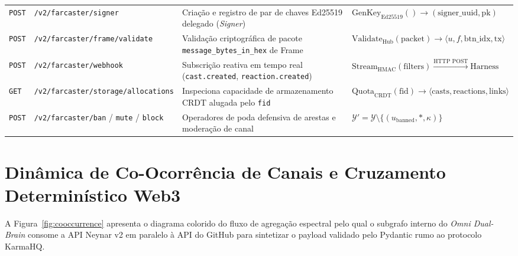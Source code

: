 \documentclass[11pt,a4paper]{article}
\begin{document}
\begin{longtable}{@{}p{1.15cm}>{\raggedright\arraybackslash}p{5.65cm}>{\raggedright\arraybackslash}p{4.15cm}>{\raggedright\arraybackslash}p{4.85cm}@{}}
\texttt{POST} & \texttt{/v2/farcaster/signer} & Criação e registro de par de chaves Ed25519 delegado (\emph{Signer}) & $\text{GenKey}_{\text{Ed25519}}() \to (\text{signer\_uuid}, \text{pk})$ \\
\rowcolor{slateBg}
\texttt{POST} & \texttt{/v2/farcaster/frame/validate} & Validação criptográfica de pacote \texttt{message\_bytes\_in\_hex} de Frame & $\text{Validate}_{\text{Hub}}(\text{packet}) \to \langle u, f, \text{btn\_idx}, \text{tx} \rangle$ \\
\texttt{POST} & \texttt{/v2/farcaster/webhook} & Subscrição reativa em tempo real (\texttt{cast.created}, \texttt{reaction.created}) & $\text{Stream}_{\text{HMAC}}(\text{filters}) \xrightarrow{\text{HTTP POST}} \text{Harness}$ \\
\rowcolor{slateBg}
\texttt{GET} & \texttt{/v2/farcaster/storage/allocations} & Inspeciona capacidade de armazenamento CRDT alugada pelo \texttt{fid} & $\text{Quota}_{\text{CRDT}}(\text{fid}) \to \langle \text{casts}, \text{reactions}, \text{links} \rangle$ \\
\texttt{POST} & \texttt{/v2/farcaster/ban} / \texttt{mute} / \texttt{block} & Operadores de poda defensiva de arestas e moderação de canal & $\mathcal{Y}' = \mathcal{Y} \setminus \{(u_{\text{banned}}, *, \kappa)\}$ \\
\end{longtable}

\section{Dinâmica de Co-Ocorrência de Canais e Cruzamento Determinístico Web3}

A Figura~\ref{fig:cooccurrence} apresenta o diagrama colorido do fluxo de agregação espectral pelo qual o subgrafo interno do \emph{Omni Dual-Brain} consome a API Neynar v2 em paralelo à API do GitHub para sintetizar o payload validado pelo Pydantic rumo ao protocolo KarmaHQ.
\end{document}
